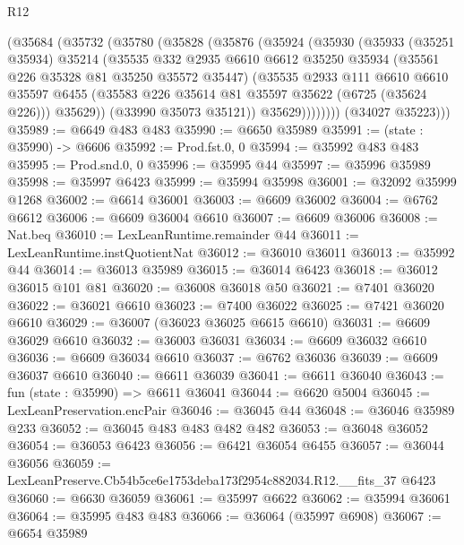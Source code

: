 \begin{lexlean}{R12}
\begin{coremodule}
          (@35684
            (@35732
              (@35780
                (@35828
                  (@35876
                    (@35924
                      (@35930
                        (@35933
                          (@35251 @35934)
                          @35214
                          (@35535
                            @332
                            @2935
                            @6610
                            @6612
                            @35250
                            @35934
                            (@35561 @226 @35328 @81 @35250 @35572 @35447)
                            (@35535
                              @2933
                              @111
                              @6610
                              @6610
                              @35597
                              @6455
                              (@35583 @226 @35614 @81 @35597 @35622 (@6725 (@35624 @226)))
                              @35629))
                          (@33990 @35073 @35121))
                        @35629))))))))
        (@34027 @35223)))
@35989 := @6649 @483 @483
@35990 := @6650 @35989
@35991 := (state : @35990) -> @6606
@35992 := Prod.fst.{0, 0}
@35994 := @35992 @483 @483
@35995 := Prod.snd.{0, 0}
@35996 := @35995 @44
@35997 := @35996 @35989
@35998 := @35997 @6423
@35999 := @35994 @35998
@36001 := @32092 @35999 @1268
@36002 := @6614 @36001
@36003 := @6609 @36002
@36004 := @6762 @6612
@36006 := @6609 @36004 @6610
@36007 := @6609 @36006
@36008 := Nat.beq
@36010 := LexLeanRuntime.remainder @44
@36011 := LexLeanRuntime.instQuotientNat
@36012 := @36010 @36011
@36013 := @35992 @44
@36014 := @36013 @35989
@36015 := @36014 @6423
@36018 := @36012 @36015 @101 @81
@36020 := @36008 @36018 @50
@36021 := @7401 @36020
@36022 := @36021 @6610
@36023 := @7400 @36022
@36025 := @7421 @36020 @6610
@36029 := @36007 (@36023 @36025 @6615 @6610)
@36031 := @6609 @36029 @6610
@36032 := @36003 @36031
@36034 := @6609 @36032 @6610
@36036 := @6609 @36034 @6610
@36037 := @6762 @36036
@36039 := @6609 @36037 @6610
@36040 := @6611 @36039
@36041 := @6611 @36040
@36043 := fun (state : @35990) => @6611 @36041
@36044 := @6620 @5004
@36045 := LexLeanPreservation.encPair
@36046 := @36045 @44
@36048 := @36046 @35989 @233
@36052 := @36045 @483 @483 @482 @482
@36053 := @36048 @36052
@36054 := @36053 @6423
@36056 := @6421 @36054 @6455
@36057 := @36044 @36056
@36059 := LexLeanPreserve.Cb54b5ce6e1753deba173f2954c882034.R12.__fits_37 @6423
@36060 := @6630 @36059
@36061 := @35997 @6622
@36062 := @35994 @36061
@36064 := @35995 @483 @483
@36066 := @36064 (@35997 @6908)
@36067 := @6654 @35989

\end{coremodule}
\end{lexlean}
